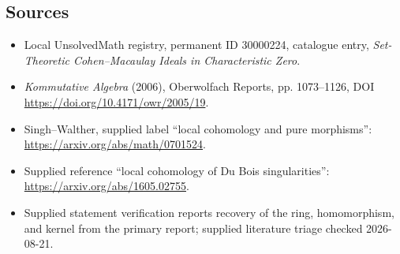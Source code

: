 \documentclass[11pt]{article}
\begin{document}
\subsection{Sources}
\begin{itemize}
\item Local UnsolvedMath registry, permanent ID 30000224, catalogue entry, \emph{Set-Theoretic Cohen--Macaulay Ideals in Characteristic Zero}.
\item \emph{Kommutative Algebra} (2006), Oberwolfach Reports, pp. 1073--1126, DOI \url{https://doi.org/10.4171/owr/2005/19}.
\item Singh--Walther, supplied label ``local cohomology and pure morphisms'': \url{https://arxiv.org/abs/math/0701524}.
\item Supplied reference ``local cohomology of Du Bois singularities'': \url{https://arxiv.org/abs/1605.02755}.
\item Supplied statement verification reports recovery of the ring, homomorphism, and kernel from the primary report; supplied literature triage checked 2026-08-21.
\end{itemize}
\end{document}
